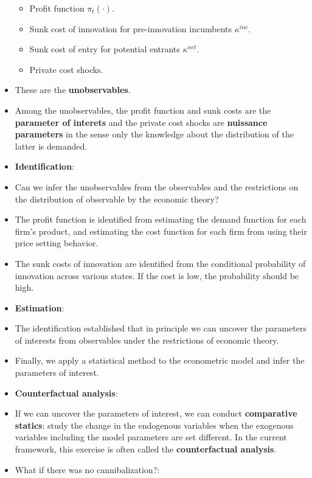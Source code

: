 \documentclass[]{book}
\providecommand{\tightlist}{%
  \setlength{\itemsep}{0pt}\setlength{\parskip}{0pt}}
\theoremstyle{definition}
\theoremstyle{definition}
\theoremstyle{definition}
\theoremstyle{remark}
\begin{document}
\begin{itemize}
  \begin{itemize}
  \tightlist
  \item
    Profit function \(\pi_t(\cdot)\).
  \item
    Sunk cost of innovation for pre-innovation incumbents
    \(\kappa^{inc}\).
  \item
    Sunk cost of entry for potential entrants \(\kappa^{net}\).
  \item
    Private cost shocks.
  \end{itemize}
\item
  These are the \textbf{unobservables}.
\item
  Among the unobservables, the profit function and sunk costs are the
  \textbf{parameter of interets} and the private cost shocks are
  \textbf{nuissance parameters} in the sense only the knowledge about
  the distribution of the latter is demanded.
\item
  \textbf{Identification}:
\item
  Can we infer the unobservables from the observables and the
  restrictions on the distribution of observable by the economic theory?
\item
  The profit function is identified from estimating the demand function
  for each firm's product, and estimating the cost function for each
  firm from using their price setting behavior.
\item
  The sunk costs of innovation are identified from the conditional
  probability of innovation across various states. If the cost is low,
  the probability should be high.
\item
  \textbf{Estimation}:
\item
  The identification established that in principle we can uncover the
  parameters of interests from observables under the restrictions of
  economic theory.
\item
  Finally, we apply a statistical method to the econometric model and
  infer the parameters of interest.
\item
  \textbf{Counterfactual analysis}:
\item
  If we can uncover the parameters of interest, we can conduct
  \textbf{comparative statics}: study the change in the endogenous
  variables when the exogenous variables including the model parameters
  are set different. In the current framework, this exercise is often
  called the \textbf{counterfactual analysis}.
\item
  What if there was no cannibalization?:


\end{itemize}
\end{document}
